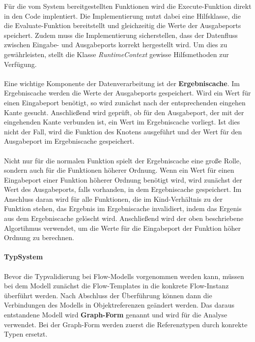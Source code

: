     Für die vom System bereitgestellten Funktionen wird die Execute-Funktion direkt in den Code implentiert. 
    Die Implementierung nutzt dabei eine Hilfsklasse, die die Evaluate-Funktion bereitstellt und gleichzeitig die Werte der Ausgabeports speichert.
    Zudem muss die Implementierung sicherstellen, dass der Datenfluss zwischen Eingabe- und Ausgabeports korrekt hergestellt wird. 
    Um dies zu gewährleisten, stellt die Klasse \textit{RuntimeContext} gewisse Hilfsmethoden zur Verfügung.\\
    \\
    Eine wichtige Komponente der Datenverarbeitung ist der \textbf{Ergebniscache}. 
    Im Ergebniscache werden die Werte der Ausgabeports gespeichert.
    Wird ein Wert für einen Eingabeport benötigt, so wird zunächst nach der entsprechenden eingehen Kante gesucht.
    Anschließend wird geprüft, ob für den Ausgabeport, der mit der eingehenden Kante verbunden ist, ein Wert im Ergebniscache vorliegt.
    Ist dies nicht der Fall, wird die Funktion des Knotens ausgeführt und der Wert für den Ausgabeport im Ergebniscache gespeichert.\\
    \\
    Nicht nur für die normalen Funktion spielt der Ergebniscache eine große Rolle, sondern auch für die Funktionen höherer Ordnung.
    Wenn ein Wert für einen Eingabeport einer Funktion höherer Ordnung benötigt wird, wird zunächst der Wert des Ausgabeports, falls vorhanden, in dem Ergebniscache gespeichert.
    Im Anschluss daran wird für alle Funktionen, die im Kind-Verhältnis zu der Funktion stehen, das Ergebnis im Ergebniscache invalidiert, indem das Ergenis aus dem Ergebniscache gelöscht wird.
    Anschließend wird der oben beschriebene Algortihmus verwendet, um die Werte für die Eingabeport der Funktion höher Ordnung zu berechnen.\\
    \\
    \textbf{TypSystem}\\
    \\
    Bevor die Typvalidierung bei Flow-Modells vorgenommen werden kann, müssen bei dem Modell zunächst die Flow-Templates in die konkrete Flow-Instanz überführt werden. 
    Nach Abschluss der Überführung können dann die Verbindungen des Modells in Objektreferenzen geändert werden. 
    Das daraus entstandene Modell wird \textbf{Graph-Form} genannt und wird für die Analyse verwendet.
    Bei der Graph-Form werden zuerst die Referenztypen durch konrekte Typen ersetzt. 
